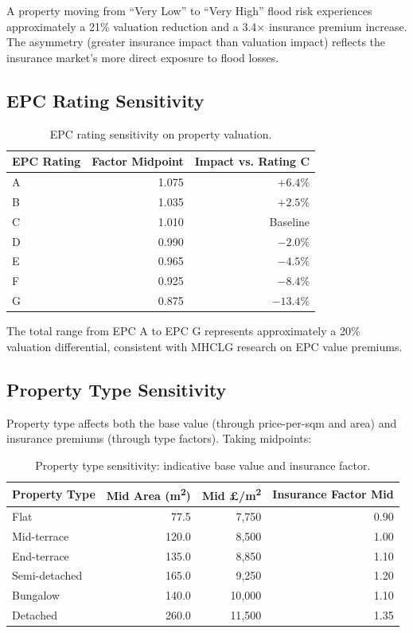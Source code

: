 \documentclass[11pt,a4paper]{article}
\begin{document}
\noindent A property moving from ``Very Low'' to ``Very High'' flood risk
experiences approximately a 21\% valuation reduction and a 3.4$\times$
insurance premium increase. The asymmetry (greater insurance impact than
valuation impact) reflects the insurance market's more direct exposure
to flood losses.

\subsection{EPC Rating Sensitivity}

\begin{table}[H]
\centering
\caption{EPC rating sensitivity on property valuation.}
\label{tab:epc_sensitivity}
\begin{tabular}{lrr}
\toprule
\textbf{EPC Rating} & \textbf{Factor Midpoint} & \textbf{Impact vs. Rating C} \\
\midrule
A & 1.075 & $+6.4\%$ \\
B & 1.035 & $+2.5\%$ \\
C & 1.010 & Baseline \\
D & 0.990 & $-2.0\%$ \\
E & 0.965 & $-4.5\%$ \\
F & 0.925 & $-8.4\%$ \\
G & 0.875 & $-13.4\%$ \\
\bottomrule
\end{tabular}
\end{table}

\noindent The total range from EPC A to EPC G represents approximately
a 20\% valuation differential, consistent with MHCLG research on EPC
value premiums.

\subsection{Property Type Sensitivity}

Property type affects both the base value (through price-per-sqm and area)
and insurance premiums (through type factors). Taking midpoints:

\begin{table}[H]
\centering
\caption{Property type sensitivity: indicative base value and insurance factor.}
\label{tab:type_sensitivity}
\begin{tabular}{lrrr}
\toprule
\textbf{Property Type} & \textbf{Mid Area (m\textsuperscript{2})} & \textbf{Mid \pounds/m\textsuperscript{2}} & \textbf{Insurance Factor Mid} \\
\midrule
Flat            &  77.5 &  7{,}750 &  0.90 \\
Mid-terrace     & 120.0 &  8{,}500 &  1.00 \\
End-terrace     & 135.0 &  8{,}850 &  1.10 \\
Semi-detached   & 165.0 &  9{,}250 &  1.20 \\
Bungalow        & 140.0 & 10{,}000 &  1.10 \\
Detached        & 260.0 & 11{,}500 &  1.35 \\
\bottomrule
\end{tabular}
\end{table}
\end{document}
